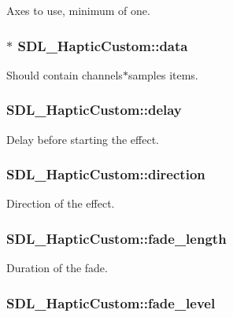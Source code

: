 Axes to use, minimum of one. \hypertarget{struct_s_d_l___haptic_custom_ad5a034f97e1699eacbe3f478538537c5}{
\subsubsection[{data}]{$\ast$ S\-D\-L\-\_\-\-Haptic\-Custom\-::data}}\label{struct_s_d_l___haptic_custom_ad5a034f97e1699eacbe3f478538537c5}
Should contain channels$\ast$samples items. \hypertarget{struct_s_d_l___haptic_custom_a094229466ff4cf695860db664100a2b0}{
\subsubsection[{delay}]{ S\-D\-L\-\_\-\-Haptic\-Custom\-::delay}}\label{struct_s_d_l___haptic_custom_a094229466ff4cf695860db664100a2b0}
Delay before starting the effect. \hypertarget{struct_s_d_l___haptic_custom_ad7eb84f59404d9e0da07570b4b57dd43}{
\subsubsection[{direction}]{ S\-D\-L\-\_\-\-Haptic\-Custom\-::direction}}\label{struct_s_d_l___haptic_custom_ad7eb84f59404d9e0da07570b4b57dd43}
Direction of the effect. \hypertarget{struct_s_d_l___haptic_custom_ab47fac94baeba28a3acd6c706e0b6a5c}{
\subsubsection[{fade\-\_\-length}]{ S\-D\-L\-\_\-\-Haptic\-Custom\-::fade\-\_\-length}}\label{struct_s_d_l___haptic_custom_ab47fac94baeba28a3acd6c706e0b6a5c}
Duration of the fade. \hypertarget{struct_s_d_l___haptic_custom_a73a522581eb514d032e500ec6294fe50}{
\subsubsection[{fade\-\_\-level}]{ S\-D\-L\-\_\-\-Haptic\-Custom\-::fade\-\_\-level}}\label{struct_s_d_l___haptic_custom_a73a522581eb514d032e500ec6294fe50}
